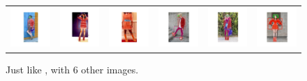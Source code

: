 \begin{figure}[H]
\begin{tabular}{cccccc}
		\includegraphics[width=.15\textwidth ,trim=13cm 5cm 13cm 5cm,clip]{figures/processedimages/7afteralmostnewwrongdoubleadded/0371919} & 
		\includegraphics[width=.15\textwidth ,trim=13cm 5cm 13cm 5cm,clip]{figures/processedimages/7afteralmostnewwrongdoubleadded/0811966} &
		\includegraphics[width=.15\textwidth ,trim=13cm 5cm 13cm 5cm,clip]{figures/processedimages/7afteralmostnewwrongdoubleadded/0895548} &
		\includegraphics[width=.15\textwidth ,trim=13cm 5cm 13cm 5cm,clip]{figures/processedimages/7afteralmostnewwrongdoubleadded/1069129} &
		\includegraphics[width=.15\textwidth ,trim=13cm 5cm 13cm 5cm,clip]{figures/processedimages/7afteralmostnewwrongdoubleadded/1088975} & 
		\includegraphics[width=.15\textwidth ,trim=13cm 5cm 13cm 5cm,clip]{figures/processedimages/7afteralmostnewwrongdoubleadded/1103207}\\
		
	\end{tabular}
	\caption{Just like , with 6 other images.}
	\label{f:processedimages2} %
\end{figure}

